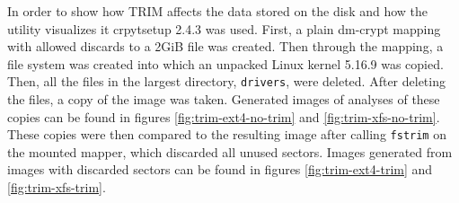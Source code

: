 \documentclass[
  digital, %
  oneside, %
  lof,     %
  lot,     %
]{fithesis4}
\begin{document}
In order to show how TRIM affects the data stored on the disk and how the utility visualizes it crpytsetup 2.4.3 was used. 
First, a plain dm-crypt mapping with allowed discards to a 2GiB file was created.
Then through the mapping, a file system was created into which an unpacked Linux kernel 5.16.9 was copied.
Then, all the files in the largest directory, \texttt{drivers}, were deleted.
After deleting the files, a copy of the image was taken.
Generated images of analyses of these copies can be found in figures \ref{fig:trim-ext4-no-trim} and \ref{fig:trim-xfs-no-trim}.
These copies were then compared to the resulting image after calling \texttt{fstrim} on the mounted mapper, which discarded all unused sectors.
Images generated from images with discarded sectors can be found in figures \ref{fig:trim-ext4-trim} and \ref{fig:trim-xfs-trim}.
\end{document}
